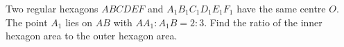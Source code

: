 Two regular hexagons $ABCDEF$ and $A_1B_1C_1D_1E_1F_1$ have the same centre $O$. The point $A_1$ lies on $AB$ with $AA_1:A_1B=2:3$. Find the ratio of the inner hexagon area to the outer hexagon area.

